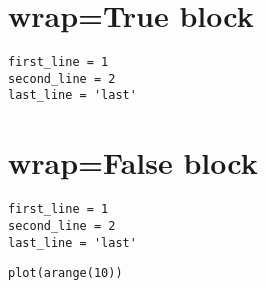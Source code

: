 \documentclass{article}
\begin{document}
\section{wrap=True block}


\begin{verbatim}
first_line = 1
second_line = 2
last_line = 'last'
\end{verbatim}


\section{wrap=False block}


\begin{verbatim}
first_line = 1
second_line = 2
last_line = 'last'
\end{verbatim}



\begin{verbatim}
plot(arange(10))
\end{verbatim}
\end{document}
